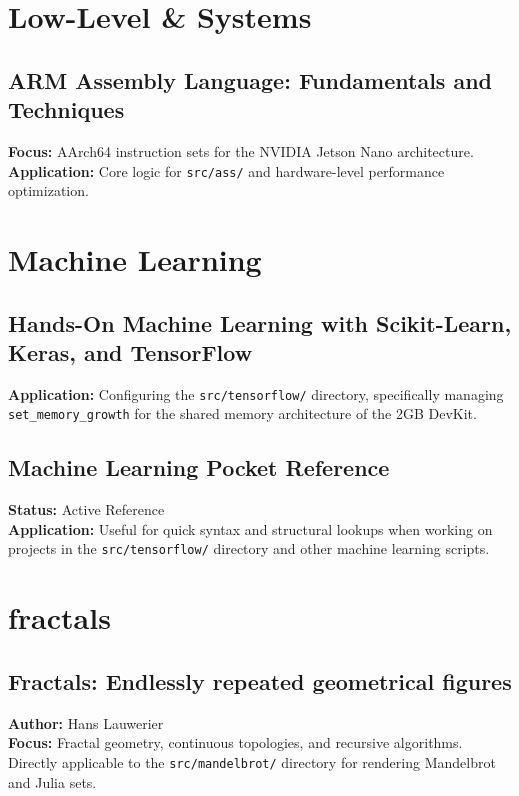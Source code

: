 \documentclass[11pt]{article}
\begin{document}
\section{Low-Level \& Systems}

\subsection*{ARM Assembly Language: Fundamentals and Techniques}
\textbf{Focus:} AArch64 instruction sets for the NVIDIA Jetson Nano architecture. 
\textbf{Application:} Core logic for \texttt{src/ass/} and hardware-level performance optimization.

\section{Machine Learning}

\subsection*{Hands-On Machine Learning with Scikit-Learn, Keras, and TensorFlow}
\textbf{Application:} Configuring the \texttt{src/tensorflow/} directory, specifically managing \texttt{set\_memory\_growth} for the shared memory architecture of the 2GB DevKit.

\subsection*{Machine Learning Pocket Reference}
\textbf{Status:} Active Reference \\
\textbf{Application:} Useful for quick syntax and structural lookups when working on projects in the \texttt{src/tensorflow/} directory and other machine learning scripts.

\section{fractals}

\subsection*{Fractals: Endlessly repeated geometrical figures}
\textbf{Author:} Hans Lauwerier \\
\textbf{Focus:} Fractal geometry, continuous topologies, and recursive algorithms. Directly applicable to the \texttt{src/mandelbrot/} directory for rendering Mandelbrot and Julia sets.
\end{document}
